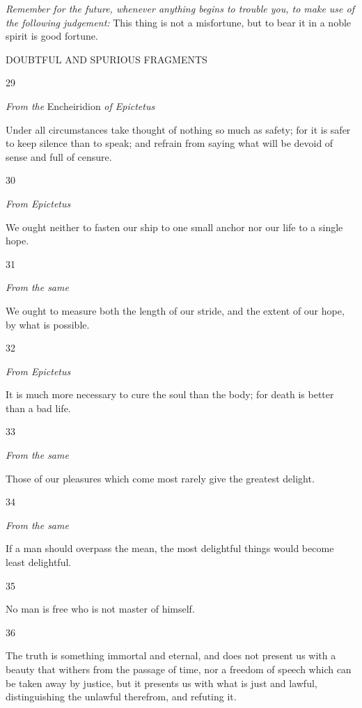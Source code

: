 \emph{Remember for the future, whenever anything begins to trouble you, to make use of the following judgement:} This thing is not a misfortune, but to bear it in a noble spirit is good fortune.

DOUBTFUL AND SPURIOUS FRAGMENTS

29

\emph{From the} Encheiridion \emph{of Epictetus}

Under all circumstances take thought of nothing so much as safety; for it is safer to keep silence than to speak; and refrain from saying what will be devoid of sense and full of censure.

30

\emph{From Epictetus}

We ought neither to fasten our ship to one small anchor nor our life to a single hope.

31

\emph{From the same}

We ought to measure both the length of our stride, and the extent of our hope, by what is possible.

32

\emph{From Epictetus}

It is much more necessary to cure the soul than the body; for death is better than a bad life.

33

\emph{From the same}

Those of our pleasures which come most rarely give the greatest delight.

34

\emph{From the same}

If a man should overpass the mean, the most delightful things would become least delightful.

35

No man is free who is not master of himself.

36

The truth is something immortal and eternal, and does not present us with a beauty that withers from the passage of time, nor a freedom of speech which can be taken away by justice, but it presents us with what is just and lawful, distinguishing the unlawful therefrom, and refuting it.

